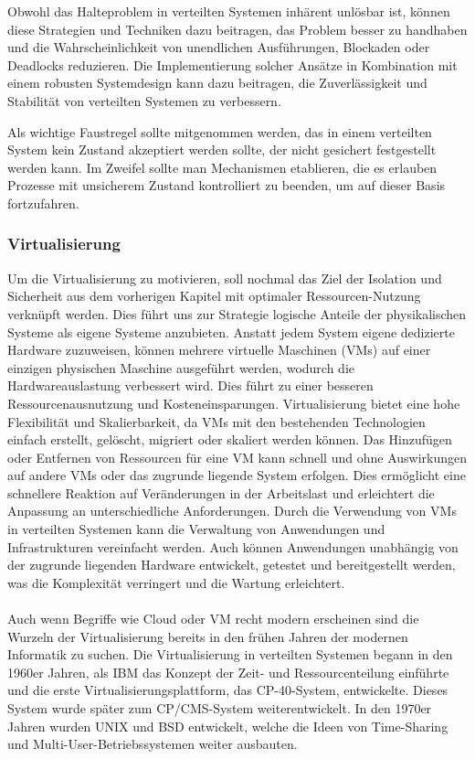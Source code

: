 Obwohl das Halteproblem in verteilten Systemen inhärent unlösbar ist, können diese Strategien und Techniken dazu beitragen, das Problem besser zu handhaben und die Wahrscheinlichkeit von unendlichen Ausführungen, Blockaden oder Deadlocks reduzieren. Die Implementierung solcher Ansätze in Kombination mit einem robusten Systemdesign kann dazu beitragen, die Zuverlässigkeit und Stabilität von verteilten Systemen zu verbessern.

Als wichtige Faustregel sollte mitgenommen werden, das in einem verteilten System kein Zustand akzeptiert werden sollte, der nicht gesichert festgestellt werden kann. Im Zweifel sollte man Mechanismen etablieren, die es erlauben Prozesse mit unsicherem Zustand kontrolliert zu beenden, um auf dieser Basis fortzufahren. 

\subsubsection{Virtualisierung}
Um die Virtualisierung zu motivieren, soll nochmal das Ziel der Isolation und Sicherheit aus dem vorherigen Kapitel mit optimaler Ressourcen-Nutzung verknüpft werden. Dies führt uns zur Strategie logische Anteile der physikalischen Systeme als eigene Systeme anzubieten. Anstatt jedem System eigene dedizierte Hardware zuzuweisen, können mehrere virtuelle Maschinen (VMs) auf einer einzigen physischen Maschine ausgeführt werden, wodurch die Hardwareauslastung verbessert wird. Dies führt zu einer besseren Ressourcenausnutzung und Kosteneinsparungen. Virtualisierung bietet eine hohe Flexibilität und Skalierbarkeit, da VMs mit den bestehenden Technologien einfach erstellt, gelöscht, migriert oder skaliert werden können. Das Hinzufügen oder Entfernen von Ressourcen für eine VM kann schnell und ohne Auswirkungen auf andere VMs oder das zugrunde liegende System erfolgen. Dies ermöglicht eine schnellere Reaktion auf Veränderungen in der Arbeitslast und erleichtert die Anpassung an unterschiedliche Anforderungen. Durch die Verwendung von VMs in verteilten Systemen kann die Verwaltung von Anwendungen und Infrastrukturen vereinfacht werden. Auch können Anwendungen unabhängig von der zugrunde liegenden Hardware entwickelt, getestet und bereitgestellt werden, was die Komplexität verringert und die Wartung erleichtert. 
\\\\
Auch wenn Begriffe wie Cloud oder VM recht modern erscheinen sind die Wurzeln der Virtualisierung bereits in den frühen Jahren der modernen Informatik zu suchen. Die Virtualisierung in verteilten Systemen begann in den 1960er Jahren, als IBM das Konzept der Zeit- und Ressourcenteilung einführte und die erste Virtualisierungsplattform, das CP-40-System, entwickelte. Dieses System wurde später zum CP/CMS-System weiterentwickelt. In den 1970er Jahren wurden UNIX und BSD entwickelt, welche die Ideen von Time-Sharing und Multi-User-Betriebssystemen weiter ausbauten.

